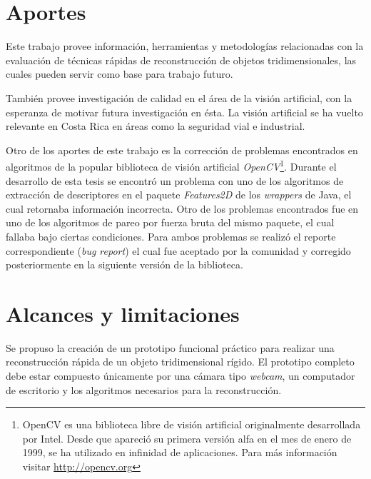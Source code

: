 \section{Aportes}
Este trabajo provee informaci\'{o}n, herramientas y metodolog\'{i}as relacionadas con la evaluaci\'{o}n de t\'{e}cnicas r\'{a}pidas de reconstrucci\'{o}n de objetos tridimensionales, las cuales pueden servir como base para trabajo futuro.

Tambi\'{e}n provee investigaci\'{o}n de calidad en el \'{a}rea de la visi\'{o}n artificial, con la esperanza de motivar futura investigaci\'{o}n en \'{e}sta. La visi\'{o}n artificial se ha vuelto relevante en Costa Rica en \'{a}reas como la seguridad vial e industrial.

Otro de los aportes de este trabajo es la correcci\'{o}n de problemas encontrados en algoritmos de la popular biblioteca de visi\'{o}n artificial \textit{OpenCV}\footnote{OpenCV es una biblioteca libre de visi\'{o}n artificial originalmente desarrollada por Intel. Desde que apareci\'{o} su primera versi\'{o}n alfa en el mes de enero de 1999, se ha utilizado en infinidad de aplicaciones. Para m\'{a}s informaci\'{o}n visitar \url{http://opencv.org}}. Durante el desarrollo de esta tesis se encontr\'{o} un problema con uno de los algoritmos de extracci\'{o}n de descriptores en el paquete \textit{Features2D} de los \textit{wrappers} de Java, el cual retornaba informaci\'{o}n incorrecta. Otro de los problemas encontrados fue en uno de los algoritmos de pareo por fuerza bruta del mismo paquete, el cual fallaba bajo ciertas condiciones. Para ambos problemas se realiz\'{o} el reporte correspondiente (\textit{bug report}) el cual fue aceptado por la comunidad y corregido posteriormente en la siguiente versi\'{o}n de la biblioteca.

\section{Alcances y limitaciones}
Se propuso la creaci\'{o}n de un prototipo funcional pr\'{a}ctico para realizar una reconstrucci\'{o}n r\'{a}pida de un objeto tridimensional r\'{i}gido. El prototipo completo debe estar compuesto \'{u}nicamente por una c\'{a}mara tipo \textit{webcam}, un computador de escritorio y los algoritmos necesarios para la reconstrucci\'{o}n.


